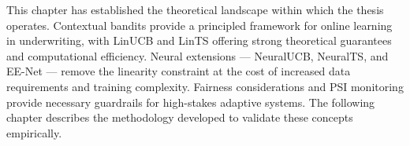 This chapter has established the theoretical landscape within which the thesis operates. Contextual bandits provide a principled framework for online learning in underwriting, with LinUCB and LinTS offering strong theoretical guarantees and computational efficiency. Neural extensions --- NeuralUCB, NeuralTS, and EE-Net --- remove the linearity constraint at the cost of increased data requirements and training complexity. Fairness considerations and PSI monitoring provide necessary guardrails for high-stakes adaptive systems. The following chapter describes the methodology developed to validate these concepts empirically.

